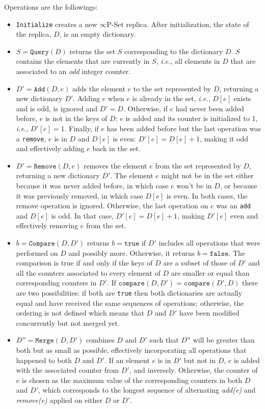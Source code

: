 \documentclass[11pt, oneside]{article}   	%
\begin{document}
Operations are the followings:
\begin{itemize}

	\item \texttt{Initialize} creates a new $\infty$P-Set replica. After initialization, the state of the replica, $D$, is an empty dictionary. 

	\item $S=\texttt{Query}(D)$ returns the set $S$ corresponding to the dictionary $D$. $S$ contains the elements that are currently in $S$, \textit{i.e.}, all elements in $D$ that are associated to an \textit{odd} integer counter.

	\item $D'=\texttt{Add}(D,e)$ adds the element $e$ to the set represented by $D$, returning a new dictionary $D'$.  Adding $e$ when $e$ is already in the set, \textit{i.e.}, $D[e]$ exists and is odd, is ignored and $D'=D$. Otherwise, if $e$ had never been added before, $e$ is not in the keys of $D$: $e$ is added and its counter is initialized to 1, \textit{i.e.}, $D'[e] = 1$. Finally, if $e$ has been added before but the last operation was a \texttt{remove}, $e$ is in $D$ and $D[e]$ is even: $D'[e] = D[e] + 1$, making it odd and effectively adding $e$ back in the set.

\item $D'=\texttt{Remove}(D, e)$ removes the element $e$ from the set represented by $D$, returning a new dictionary $D'$. The element $e$ might not be in the set either because it was never added before, in which case $e$ won't be in $D$, or because it was previously removed, in which case $D[e]$ is even. In both cases, the remove operation is ignored. Otherwise, the last operation on $e$ was an \texttt{add} and $D[e]$ is odd. In that case, $D'[e]=D[e]+1$, making $D'[e]$ even and effectively removing $e$ from the set.

\item $b=\texttt{Compare}(D, D')$ returns $b=\texttt{true}$ if $D'$ includes all operations that were performed on $D$ and possibly more. Otherwise, it returns $b=\texttt{false}$. The comparison is true if and only if the keys of $D$ are a subset of those of $D'$ and all the counters associated to every element of $D$ are smaller or equal than corresponding counters in $D'$. If $\texttt{compare}(D,D')= \texttt{compare}(D',D)$ there are two possibilities: if both are \texttt{true} then both dictionaries are actually equal and have received the same sequences of operations; otherwise, the ordering is not defined which means that $D$ and $D'$ have been modified concurrently but not merged yet.

\item $D''=\texttt{Merge}(D, D')$ combines $D$ and $D'$ such that $D''$ will be greater than both but as small as possible, effectively incorporating all operations that happened to both $D$ and $D'$. If an element $e$ is  in $D'$ but not in $D$, $e$ is added with the associated counter from $D'$, and inversely. Otherwise, the counter of $e$ is chosen as the maximum value of the corresponding counters in both $D$ and $D'$, which corresponds to the longest sequence of alternating \textit{add(e)} and \textit{remove(e)} applied on either $D$ or $D'$.
\end{itemize}
\end{document}
